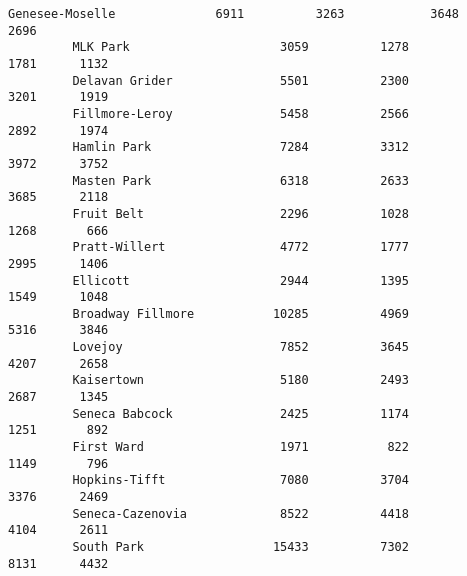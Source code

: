 \documentclass[11pt]{article}
\begin{document}
\begin{Verbatim}[commandchars=\\\{\}]
         Genesee-Moselle              6911          3263            3648      2696   
         MLK Park                     3059          1278            1781      1132   
         Delavan Grider               5501          2300            3201      1919   
         Fillmore-Leroy               5458          2566            2892      1974   
         Hamlin Park                  7284          3312            3972      3752   
         Masten Park                  6318          2633            3685      2118   
         Fruit Belt                   2296          1028            1268       666   
         Pratt-Willert                4772          1777            2995      1406   
         Ellicott                     2944          1395            1549      1048   
         Broadway Fillmore           10285          4969            5316      3846   
         Lovejoy                      7852          3645            4207      2658   
         Kaisertown                   5180          2493            2687      1345   
         Seneca Babcock               2425          1174            1251       892   
         First Ward                   1971           822            1149       796   
         Hopkins-Tifft                7080          3704            3376      2469   
         Seneca-Cazenovia             8522          4418            4104      2611   
         South Park                  15433          7302            8131      4432   
         

\end{Verbatim}
\end{document}
